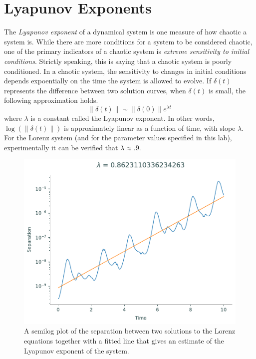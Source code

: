 \section*{Lyapunov Exponents}
The \textit{Lyapunov exponent} of a dynamical system is one measure of how chaotic a system is.
While there are more conditions for a system to be considered chaotic, one of the primary indicators of a chaotic system is \textit{extreme sensitivity to initial conditions}.
Strictly speaking, this is saying that a chaotic system is poorly conditioned.
In a chaotic system, the sensitivity to changes in initial conditions depends expoentially on the time the system is allowed to evolve.
If $\delta(t)$ represents the difference between two solution curves, when $\delta(t)$ is small, the following approximation holds.
\[\|\delta(t)\| \sim \|\delta(0)\| e^{\lambda t}\]
where $\lambda$ is a constant called the Lyapunov exponent. In other words, $\log(\|\delta(t)\|)$ is approximately linear as a function of time, with slope $\lambda$.
For the Lorenz system (and for the parameter values specified in this lab), experimentally it can be verified that $\lambda \approx .9$.

\begin{figure}
\includegraphics[width=\textwidth]{figures/semilog.pdf}
\caption{A semilog plot of the separation between two solutions to the Lorenz equations together with a fitted line that gives an estimate of the Lyapunov exponent of the system.}
\label{fig:lyapunov_exponent}
\end{figure}

